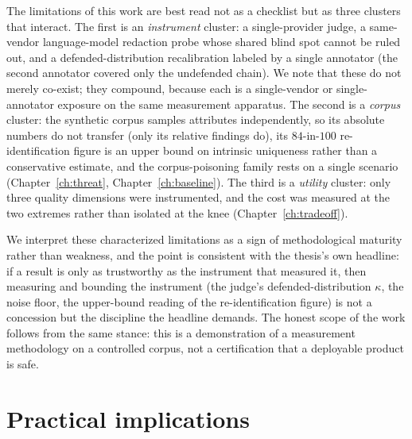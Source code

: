 The limitations of this work are best read not as a checklist but as three clusters that
interact. The first is an \emph{instrument} cluster: a single-provider judge, a same-vendor
language-model redaction probe whose shared blind spot cannot be ruled out, and a
defended-distribution recalibration labeled by a single annotator (the second annotator
covered only the undefended chain). We note that these do
not merely co-exist; they compound, because each is a single-vendor or single-annotator exposure
on the same measurement apparatus. The second is a \emph{corpus} cluster: the synthetic corpus
samples attributes independently, so its absolute numbers do not transfer (only its relative
findings do), its $84$-in-$100$ re-identification figure is an upper bound on intrinsic
uniqueness rather than a conservative estimate, and the corpus-poisoning family rests on a single
scenario (Chapter~\ref{ch:threat}, Chapter~\ref{ch:baseline}). The third is a \emph{utility}
cluster: only three quality dimensions were instrumented, and the cost was measured at the two
extremes rather than isolated at the knee (Chapter~\ref{ch:tradeoff}).

We interpret these characterized limitations as a sign of methodological maturity rather than
weakness, and the point is consistent with the thesis's own headline: if a result is
only as trustworthy as the instrument that measured it, then measuring and bounding the
instrument (the judge's defended-distribution $\kappa$, the noise floor, the upper-bound
reading of the re-identification figure) is not a concession but the discipline the headline
demands. The honest scope of the work follows from the same stance: this is a demonstration of a
measurement methodology on a controlled corpus, not a certification that a deployable product is
safe.

\section{Practical implications}
\label{sec:disc-practical}

